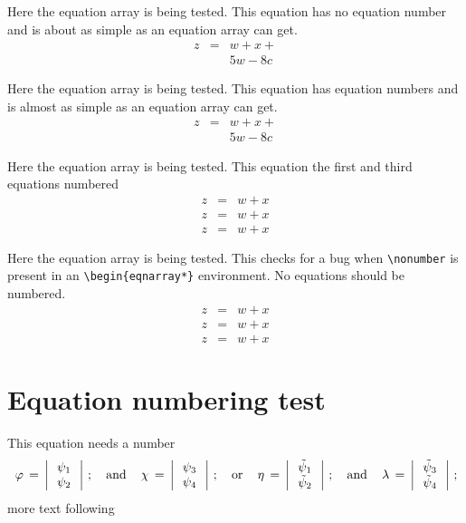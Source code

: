 \documentclass{article}
\begin{document}
Here the equation array is being tested.  This equation has no equation number
and is about as simple as an equation array can get.
\begin{eqnarray*}
z & = & w + x + \\
  &   & 5w - 8c 
\end{eqnarray*}

Here the equation array is being tested.  This equation has equation numbers
and is almost as simple as an equation array can get.
\begin{eqnarray}
z & = & w + x + \\
  &   & 5w - 8c 
\end{eqnarray}

Here the equation array is being tested.  This equation the first and third equations numbered
\begin{eqnarray}
z & = & w + x  \\
z & = & w + x \nonumber\\
z & = & w + x  
\end{eqnarray}

Here the equation array is being tested.  This checks for a bug when 
\verb#\nonumber# is present in an \verb#\begin{eqnarray*}# environment.  
No equations should be numbered.
\begin{eqnarray*}
z & = & w + x  \\
z & = & w + x \nonumber\\
z & = & w + x  
\end{eqnarray*}

\section{Equation numbering test}
This equation needs a number 
\begin{equation}\label{ab3}
\,\varphi\,=\,\left|\,
\begin{array}{c}
\psi_1 \\
\psi_2
\end{array}\,\right|\,; \quad {\rm and} \quad
\,\chi\,=\,\left|\,
\begin{array}{c}
\psi_3 \\
\psi_4
\end{array}\,\right|\,; \quad {\rm or} \quad
\,\eta\,=\,\left|\,
\begin{array}{c}
\tilde{\psi}_1 \\
\tilde{\psi}_2
\end{array}\,\right|\,; \quad {\rm and} \quad
\,\lambda\,=\,\left|\,
\begin{array}{c}
\tilde{\psi}_3 \\
\tilde{\psi}_4
\end{array}\,\right|\,;
\end{equation}
more text following
\end{document}
